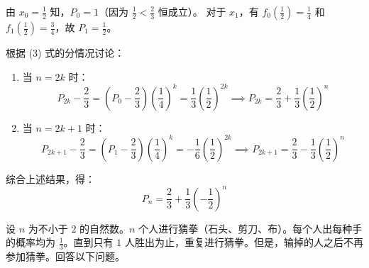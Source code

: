 \begin{questions}
\begin{solution}
由 $x_0 = \frac{1}{2}$ 知，$P_0 = 1$（因为 $\frac{1}{2} < \frac{2}{3}$ 恒成立）。
对于 $x_1$，有 $f_0(\frac{1}{2}) = \frac{1}{4}$ 和 $f_1(\frac{1}{2}) = \frac{3}{4}$，故 $P_1 = \frac{1}{2}$。

根据 (3) 式的分情况讨论：
\begin{enumerate}
    \item[(i)] 当 $n=2k$ 时：
    \[ P_{2k} - \frac{2}{3} = (P_0 - \frac{2}{3}) (\frac{1}{4})^k = \frac{1}{3} (\frac{1}{2})^{2k} \implies P_{2k} = \frac{2}{3} + \frac{1}{3} (\frac{1}{2})^n \]
    \item[(ii)] 当 $n=2k+1$ 时：
    \[ P_{2k+1} - \frac{2}{3} = (P_1 - \frac{2}{3}) (\frac{1}{4})^k = -\frac{1}{6} (\frac{1}{2})^{2k} \implies P_{2k+1} = \frac{2}{3} - \frac{1}{3} (\frac{1}{2})^n \]
\end{enumerate}

综合上述结果，得：
\[ P_n = \frac{2}{3} + \frac{1}{3} \left( -\frac{1}{2} \right)^n \]
\end{solution}

\question
设 $n$ 为不小于 $2$ 的自然数。$n$ 个人进行猜拳（石头、剪刀、布）。每个人出每种手的概率均为 $\frac{1}{3}$。直到只有 $1$ 人胜出为止，重复进行猜拳。但是，输掉的人之后不再参加猜拳。回答以下问题。

\end{questions}
